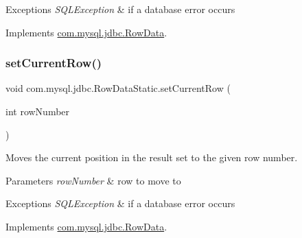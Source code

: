 \begin{DoxyExceptions}{Exceptions}
{\em S\+Q\+L\+Exception} & if a database error occurs \\
\hline
\end{DoxyExceptions}


Implements \mbox{\hyperlink{interfacecom_1_1mysql_1_1jdbc_1_1_row_data_ac60b2e20cd7043fb730f0977386e80be}{com.\+mysql.\+jdbc.\+Row\+Data}}.

\mbox{\label{classcom_1_1mysql_1_1jdbc_1_1_row_data_static_a7ffde91e716fbad68c1ee53657ba969f}} 
\subsubsection{\texorpdfstring{set\+Current\+Row()}{setCurrentRow()}}
{\footnotesize\ttfamily void com.\+mysql.\+jdbc.\+Row\+Data\+Static.\+set\+Current\+Row (\begin{DoxyParamCaption}\item[{int}]{row\+Number }\end{DoxyParamCaption})}

Moves the current position in the result set to the given row number.


\begin{DoxyParams}{Parameters}
{\em row\+Number} & row to move to \\
\hline
\end{DoxyParams}

\begin{DoxyExceptions}{Exceptions}
{\em S\+Q\+L\+Exception} & if a database error occurs \\
\hline
\end{DoxyExceptions}


Implements \mbox{\hyperlink{interfacecom_1_1mysql_1_1jdbc_1_1_row_data_af1db64feefc1ecf2db53a72ec6063839}{com.\+mysql.\+jdbc.\+Row\+Data}}.

\mbox{\label{classcom_1_1mysql_1_1jdbc_1_1_row_data_static_a499ed56e7c10c7722c80d15a15529d5f}} 
